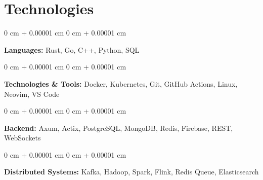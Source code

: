 \documentclass[10pt, letterpaper]{article}
\newenvironment{onecolentry}{
    \begin{adjustwidth}{
        0 cm + 0.00001 cm
    }{
        0 cm + 0.00001 cm
    }
}{
    \end{adjustwidth}
} %
\begin{document}
\section{Technologies}

\begin{onecolentry}
    \textbf{Languages:} Rust, Go, C++, Python, SQL
\end{onecolentry}

\begin{onecolentry}
    \textbf{Technologies \& Tools:} Docker, Kubernetes, Git, GitHub Actions, Linux, Neovim, VS Code
\end{onecolentry}

\begin{onecolentry}
    \textbf{Backend:} Axum, Actix, PostgreSQL, MongoDB, Redis, Firebase, REST, WebSockets
\end{onecolentry}

\begin{onecolentry}
    \textbf{Distributed Systems:} Kafka, Hadoop, Spark, Flink, Redis Queue, Elasticsearch
\end{onecolentry}
\end{document}
